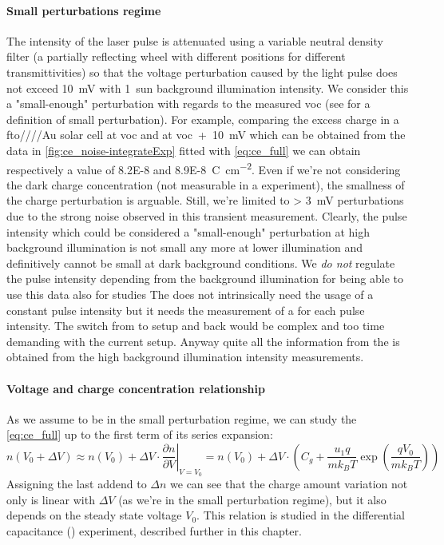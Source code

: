 	\paragraph{Small perturbations regime}
	The intensity of the laser pulse is attenuated using a variable neutral density filter (a partially reflecting wheel with different positions for different transmittivities) so that the voltage perturbation caused by the light pulse does not exceed \SI{10}{\mV} with 1~sun background illumination intensity.
	We consider this a "small-enough" perturbation with regards to the measured \gls{voc} (see  for a definition of small perturbation).
	For example, comparing the excess charge in a \gls{fto}\-/\dTiOtwo\-/\-/\spiro\-/Au solar cell at \gls{voc} and at \gls{voc}~+~\SI{10}{\mV} which can be obtained from the data in \cref{fig:ce_noise-integrateExp} fitted with \cref{eq:ce_full} we can obtain respectively a value of \SI{8.2E-8}{} and \SI{8.9E-8}{\coulomb\per\square\cm}.
	Even if we're not considering the dark charge concentration (not measurable in a  experiment), the smallness of the charge perturbation is arguable.
	Still, we're limited to \SI{> 3}{\mV} perturbations due to the strong noise observed in this transient measurement.
	Clearly, the pulse intensity which could be considered a "small-enough" perturbation at high background illumination is not small any more at lower illumination and definitively cannot be small at dark background conditions.
	We \emph{do not} regulate the pulse intensity depending from the background illumination for being able to use this data also for  studies
	 The  does not intrinsically need the usage of a constant pulse intensity but it needs the measurement of a  for each pulse intensity.
	The switch from  to  setup and back would be complex and too time demanding with the current setup.
	Anyway quite all the information from the  is obtained from the high background illumination intensity measurements.
	
	\paragraph{Voltage and charge concentration relationship} As we assume to be in the small perturbation regime, we can study the \cref{eq:ce_full} up to the first term of its series expansion:
	\begin{dmath*}
	n(V_0 + \Delta V) \approx n(V_0) + \Delta V \cdot \left.\frac{\partial n}{\partial V}\right\rvert_{V=V_0} = n(V_0) + \Delta V \cdot \left(C_g + \frac{u_1q}{mk_BT}\exp\left(\frac{qV_0}{mk_BT}\right)\right)
	\end{dmath*}
	Assigning the last addend to $\Delta n$ we can see that the charge amount variation not only is linear with $\Delta V$ (as we're in the small perturbation regime), but it also depends on the steady state voltage $V_0$. This relation is studied in the differential capacitance () experiment, described further in this chapter. 
	
